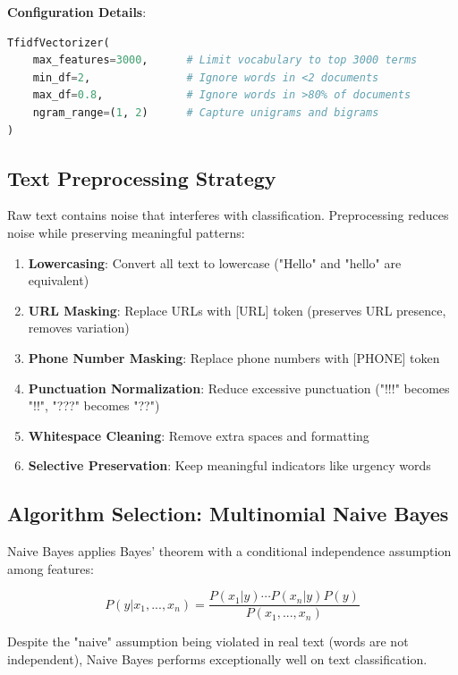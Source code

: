 \documentclass[12pt,a4paper]{article}
\begin{document}
\textbf{Configuration Details}:
\begin{lstlisting}[language=Python]
TfidfVectorizer(
    max_features=3000,      # Limit vocabulary to top 3000 terms
    min_df=2,               # Ignore words in <2 documents
    max_df=0.8,             # Ignore words in >80% of documents
    ngram_range=(1, 2)      # Capture unigrams and bigrams
)
\end{lstlisting}

\subsection{Text Preprocessing Strategy}

Raw text contains noise that interferes with classification. Preprocessing reduces noise while preserving meaningful patterns:

\begin{enumerate}
    \item \textbf{Lowercasing}: Convert all text to lowercase ("Hello" and "hello" are equivalent)
    \item \textbf{URL Masking}: Replace URLs with [URL] token (preserves URL presence, removes variation)
    \item \textbf{Phone Number Masking}: Replace phone numbers with [PHONE] token
    \item \textbf{Punctuation Normalization}: Reduce excessive punctuation ("!!!" becomes "!!", "???" becomes "??")
    \item \textbf{Whitespace Cleaning}: Remove extra spaces and formatting
    \item \textbf{Selective Preservation}: Keep meaningful indicators like urgency words
\end{enumerate}

\subsection{Algorithm Selection: Multinomial Naive Bayes}

Naive Bayes applies Bayes' theorem with a conditional independence assumption among features:

\begin{equation}
P(y|x_1, ..., x_n) = \frac{P(x_1|y) \cdots P(x_n|y) P(y)}{P(x_1, ..., x_n)}
\end{equation}

Despite the "naive" assumption being violated in real text (words are not independent), Naive Bayes performs exceptionally well on text classification.
\end{document}
